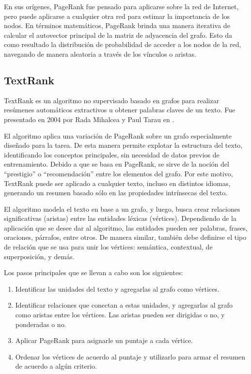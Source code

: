 \documentclass[a4paper]{article}
\begin{document}
En sus orígenes, PageRank fue pensado para aplicarse sobre la red de Internet, pero puede aplicarse a cualquier otra red para estimar la importancia de los nodos. En términos matemáticos, PageRank brinda una manera iterativa de calcular el autovector principal de la matriz de adyacencia del grafo. Esto da como resultado la distribución de probabilidad de acceder a los nodos de la red, navegando de manera aleatoria a través de los vínculos o aristas.


\subsection{TextRank}
TextRank es un algoritmo no supervisado basado en grafos para realizar resúmenes automáticos extractivos u obtener palabras claves de un texto. Fue presentado en 2004 por Rada Mihalcea y Paul Tarau en \cite{mihalcea-tarau}.

El algoritmo aplica una variación de PageRank \cite{pageetal98} sobre un grafo especialmente diseñado para la tarea. De esta manera permite explotar la estructura del texto, identificando los conceptos principales, sin necesidad de datos previos de entrenamiento. Debido a que se basa en PageRank, se sirve de la noción del “prestigio” o “recomendación” entre los elementos del grafo. Por este motivo, TextRank puede ser aplicado a cualquier texto, incluso en distintos idiomas, generando un resumen basado sólo en las propiedades intrínsecas del texto.

El algoritmo modela el texto en base a un grafo, y luego, busca crear relaciones significativas (aristas) entre las entidades léxicas (vértices). Dependiendo de la aplicación que se desee dar al algoritmo, las entidades pueden ser palabras, frases, oraciones, párrafos, entre otros. De manera similar, también debe definirse el tipo de relación que se usa para unir los vértices: semántica, contextual, de superposición, y demás.

Los pasos principales que se llevan a cabo son los siguientes:

\begin{enumerate}
\item Identificar las unidades del texto y agregarlas al grafo como vértices.
\item Identificar relaciones que conectan a estas unidades, y agregarlas al grafo como aristas entre los vértices. Las aristas pueden ser dirigidas o no, y ponderadas o no.
\item Aplicar PageRank para asignarle un puntaje a cada vértice.
\item Ordenar los vértices de acuerdo al puntaje y utilizarlo para armar el resumen de acuerdo a algún criterio.
\end{enumerate}
\end{document}
